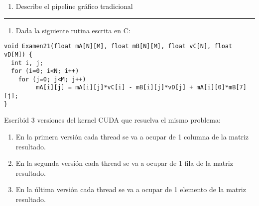 
%
%
%
%
%
%
%
%
%

\newcommand{\sep}{\hrule}

\newcommand{\pregunta}[1]{
    \pagebreak
    \begin{enumerate}[resume]
        \item #1
    \end{enumerate}
}

\pregunta{Describe el pipeline gráfico tradicional}\sep{}

\pregunta{Dada la siguiente rutina escrita en C:}

\begin{verbatim}
void Examen21(float mA[N][M], float mB[N][M], float vC[N], float vD[M]) {
  int i, j;
  for (i=0; i<N; i++)
    for (j=0; j<M; j++)
         mA[i][j] = mA[i][j]*vC[i] - mB[i][j]*vD[j] + mA[i][0]*mB[7][j];
}
\end{verbatim}

Escribid 3 versiones del kernel CUDA que resuelva el mismo problema:

\begin{enumerate}[label=(\alph*)]
    \item En la primera versión cada thread se va a ocupar de 1 columna de la matriz resultado.
    \item En la segunda versión cada thread se va a ocupar de 1 fila de la matriz resultado.
    \item En la última versión cada thread se va a ocupar de 1 elemento de la matriz resultado.
\end{enumerate}

